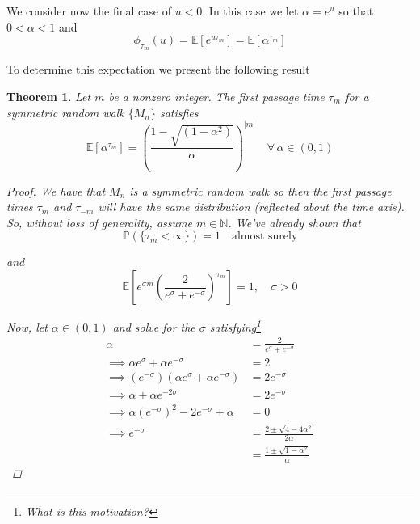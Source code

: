 \documentclass[12pt]{article}
\newtheorem{theorem}{Theorem}
\newcommand{\N}{\mathbb N}
\renewcommand{\P}{\mathbb P}
\newcommand{\E}{\mathbb E}
\begin{document}
We consider now the final case of $u < 0$. In this case we let $\alpha = e^u$ so that $0 < \alpha  < 1$ and
\begin{equation*}
	\phi_{\tau_m}(u) = \E[e^{u\tau_m}] = \E[\alpha^{\tau_m}]
\end{equation*} 

To determine this expectation we present the following result

\begin{theorem} Let $m$ be a nonzero integer. The first passage time $\tau_m$ for a symmetric random walk $\{M_n\}$ satisfies
\begin{equation*}
	\E[\alpha^{\tau_m}] = \left( \frac{ 1 - \sqrt{(1 - \alpha^2)} }{ \alpha } \right)^{|m|} \quad \forall\,\alpha\in(0,1)
\end{equation*}

\begin{proof} We have that $M_n$ is a symmetric random walk so then the first passage times $\tau_m$ and $\tau_{-m}$ will have the same distribution (reflected about the time axis). So, without loss of generality, assume $m \in \N$. We've already shown that
\begin{equation*}
	\P(\{\tau_m < \infty\}) = 1 \quad \text{almost surely}
\end{equation*}

and
\begin{equation*}
	\E \left[ e^{\sigma m} \left( \frac{2}{ e^\sigma + e^{-\sigma}} \right)^{\tau_m} \right] = 1, \quad \sigma > 0
\end{equation*}

Now, let $\alpha \in (0,1)$ and solve for the $\sigma$ satisfying\footnote{What is this motivation?}
\begin{align*}
	\alpha &= \frac{2}{e^\sigma + e^{-\sigma}} \\
	\implies \alpha e^\sigma + \alpha e^{-\sigma} &= 2 \\
	\implies \left( e^{-\sigma} \right) \left( \alpha e^\sigma + \alpha e^{-\sigma}  \right) &= 2e^{-\sigma} \\
	\implies \alpha + \alpha e^{-2\sigma} &= 2e^{-\sigma} \\
	\implies \alpha \left(e^{-\sigma}\right)^2 - 2e^{-\sigma} + \alpha &= 0 \\
	\implies e^{-\sigma} &= \frac{ 2\pm \sqrt{4 - 4\alpha^2} }{ 2\alpha }  \\
	&= \frac{ 1\pm\sqrt{1 - \alpha^2} }{ \alpha } 
\end{align*}


\end{proof}
\end{theorem}
\end{document}
